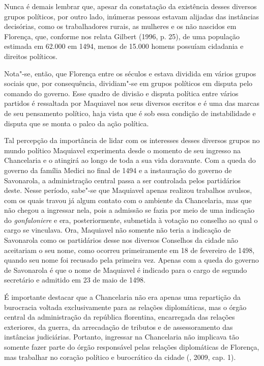 Nunca é demais lembrar que, apesar da constatação da existência desses
diversos grupos políticos, por outro lado, inúmeras pessoas estavam
alijadas das instâncias decisórias, como os trabalhadores rurais, as
mulheres e os não nascidos em Florença, que, conforme nos relata Gilbert
(1996, p. 25), de uma população estimada em 62.000 em 1494, menos de
15.000 homens possuíam cidadania e direitos políticos.

Nota"-se, então, que Florença entre os séculos  e  estava dividida
em vários grupos sociais que, por consequência, dividiam"-se em grupos
políticos em disputa pelo comando do governo. Esse quadro de divisão e
disputa política entre vários partidos é ressaltada por Maquiavel nos
seus diversos escritos e é uma das marcas de seu pensamento político,
haja vista que é sob essa condição de instabilidade e disputa que se
monta o palco da ação política.

Tal percepção da importância de lidar com os interesses desses diversos
grupos no mundo político Maquiavel experimenta desde o momento de seu
ingresso na Chancelaria e o atingirá ao longo de toda a sua vida
doravante. Com a queda do governo da família Medici no final de 1494 e a
instauração do governo de Savonarola, a administração central passa a
ser controlada pelos partidários deste. Nesse período, sabe"-se que
Maquiavel apenas realizou trabalhos avulsos, com os quais travou já
algum contato com o ambiente da Chancelaria, mas que não chegou a
ingressar nela, pois a admissão se fazia por meio de uma indicação do
\emph{gonfaloniere} e era, posteriormente, submetida à votação no
conselho ao qual o cargo se vinculava. Ora, Maquiavel não somente não
teria a indicação de Savonarola como os partidários desse nos diversos
Conselhos da cidade não aceitariam o seu nome, como ocorreu
primeiramente em 18 de fevereiro de 1498, quando seu nome foi recusado
pela primeira vez. Apenas com a queda do governo de Savonarola é que o
nome de Maquiavel é indicado para o cargo de segundo secretário e
admitido em 23 de maio de 1498.

É importante destacar que a Chancelaria não era apenas uma repartição da
burocracia voltada exclusivamente para as relações diplomáticas, mas o
órgão central da administração da república florentina, encarregada das
relações exteriores, da guerra, da arrecadação de tributos e de
assessoramento das instâncias judiciárias. Portanto, ingressar na
Chancelaria não implicava tão somente fazer parte do órgão responsável
pelas relações diplomáticas de Florença, mas trabalhar no coração
político e burocrático da cidade (, 2009, cap. 1).

